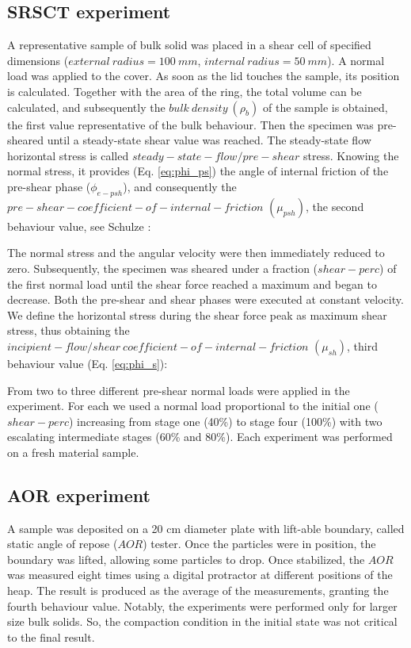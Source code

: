 \begin{appendix}
\subsection{SRSCT experiment}
\label{subsec:srsctexperiment}
A representative sample of bulk solid was placed in a shear cell of specified
dimensions ($external ~ radius = 100 ~ mm$, $internal ~ radius = 50 ~ mm$).
A normal load was applied to the cover. As soon as the lid touches the sample, its position is calculated.
Together with the area of the ring, the total volume can be calculated, and subsequently the $bulk ~ density ~ (\rho_b)$ 
of the sample is obtained, the first value representative of the bulk behaviour.
Then the specimen was pre-sheared until a steady-state shear value was reached.
The steady-state flow horizontal stress
is called $steady-state-flow/pre-shear$ stress.
Knowing the normal stress, it provides (Eq. \ref{eq:phi_ps}) the angle of
internal friction of the pre-shear phase ($\phi_{e-psh}$), and consequently the
$pre-shear-coefficient-of-internal-friction $ $ (\mu_{psh})$, the second
behaviour value, see Schulze \cite{RefWorks:118}:
   
The normal stress and the angular velocity were then immediately reduced to zero. 
Subsequently, the specimen was sheared under a fraction ($shear-perc$) of the first normal load until the shear force 
reached a maximum and began to decrease. 
Both the pre-shear and shear phases were executed at constant velocity. 
We define the horizontal stress during the shear force peak as maximum shear stress, 
thus obtaining the $incipient-flow/shear ~ coefficient-of-internal-friction $ $
(\mu_{sh})$, third behaviour value (Eq. \ref{eq:phi_s})\cite{RefWorks:118}:
 
From two to three different pre-shear normal loads were applied in the experiment. 
For each we used a normal load proportional to the initial one ($shear-perc$) increasing from stage one (40\%) 
to stage four (100\%) with two escalating intermediate stages (60\% and 80\%).
Each experiment was performed on a fresh material sample. \\

\subsection{AOR experiment}
\label{subsec:aorexperiment}
A sample was deposited on a 20 cm diameter plate with lift-able boundary, called
static angle of repose ($AOR$) tester.
Once the particles were in position, the boundary was lifted, allowing some particles to drop. 
Once stabilized, the $AOR$ was measured eight times using a digital protractor at different positions of the heap. 
The result is produced as the average of the measurements, granting the fourth
behaviour value.
Notably, the experiments were performed only for larger size bulk solids. 
So, the compaction condition in the initial state was not critical to the final result.






\end{appendix}